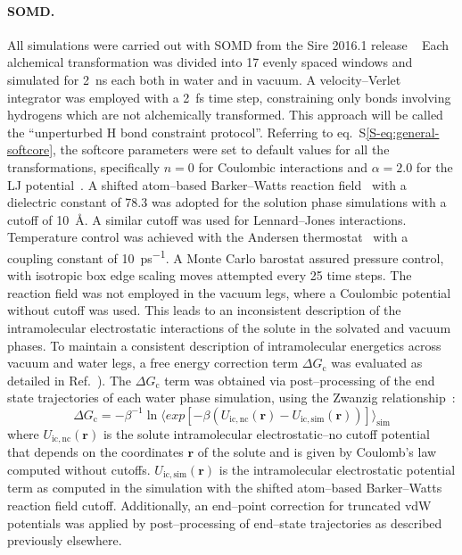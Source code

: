\documentclass[journal=jctcce,manuscript=article]{achemso}
\begin{document}
\paragraph{SOMD.} All simulations were carried out with
SOMD from the Sire 2016.1 release ~\cite{Sire-2016, doi:10.1021/ct300857j}
Each alchemical transformation was
divided into 17 evenly spaced windows and simulated for \SI{2}{ns}
each both in water and in vacuum.  A velocity--Verlet integrator was
employed with a \SI{2}{fs} time step, constraining only bonds
involving hydrogens which are not alchemically transformed.  This
approach will be called the ``unperturbed H bond constraint
protocol''.  Referring to eq.~S\ref{S-eq:general-softcore}, the softcore parameters were set to default values for all the transformations, specifically $n = 0$ for Coulombic interactions and $\alpha = 2.0$ for the LJ potential~\cite{doi:10.1021/ct700081t}.  A shifted atom--based Barker--Watts reaction field~\cite{doi:10.1080/00268977300102101} with
a dielectric constant of \num{78.3} was adopted for the solution phase
simulations with a cutoff of \SI{10}{\angstrom}. A similar cutoff was used for
Lennard--Jones interactions.  Temperature control was achieved with the Andersen
thermostat~\cite{doi:10.1063/1.439486} with a coupling constant of
\SI{10}{ps^{-1}}.  A Monte Carlo barostat assured pressure control,
with isotropic box edge scaling moves attempted every 25 time steps.
The reaction field was not employed in the vacuum legs, where a Coulombic
potential without cutoff was used.  This leads to an inconsistent description of the intramolecular electrostatic interactions of the solute in the solvated and vacuum phases.  To maintain a consistent description of intramolecular
energetics across vacuum and water legs, a free energy correction term $\Delta G_{\mathrm{c}}$ was evaluated as detailed in Ref.~).  The
$\Delta G_{\mathrm{c}}$ term was obtained via post--processing of the end state
trajectories of each water phase simulation, using the Zwanzig
relationship~\cite{zwanzig_high-temperature_1954}:
\begin{equation}
 \label{eq:ZwanzigDGfunc}
 \Delta G_{\mathrm{c}} = -\beta^{-1} \ln \langle exp
 \left[-\beta(U_{\mathrm{ic,nc}}(\mathbf{r}) -
 U_{\mathrm{ic,sim}}(\mathbf{r}))\right]\rangle_{\mathrm{sim}}
\end{equation}
where $U_{\mathrm{ic,nc}}(\mathbf{r})$ is the solute intramolecular
electrostatic--no cutoff
potential that depends on the coordinates $\mathbf{r}$ of the solute and is
given by Coulomb's law computed without cutoffs.
$U_{\mathrm{ic,sim}}(\mathbf{r})$ is the intramolecular electrostatic potential
term as
computed in the simulation with the shifted atom--based Barker--Watts reaction
field cutoff.  Additionally, an end--point correction for truncated vdW potentials was applied by post--processing of end--state trajectories as described previously elsewhere.~\cite{shirtsLRC,BosisioHG}
\end{document}
